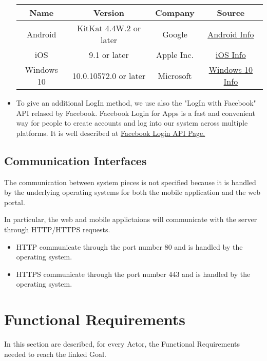\documentclass{report}
\begin{document}
\begin{itemize}
\begin{center}
\begin{table}[h!]
\begin{center}
								\begin{tabular}{cccc}
									\toprule
									\textbf{Name} & \textbf{Version} & \textbf{Company} & \textbf{Source}\\
									\midrule
									Android & KitKat 4.4W.2 or later & Google & \href{https://www.android.com}{Android Info}\\
									\midrule
									iOS & 9.1 or later & Apple Inc. & \href{http://www.apple.com/ios/}{iOS Info}\\
									\midrule
									Windows 10 & 10.0.10572.0 or later & Microsoft & \href{http://www.microsoft.com/it-it/mobile/windows10/?dcmpid=omc-org-globalsite.globalredirect}{Windows 10 Info}\\
									\bottomrule
								\end{tabular}
							\end{center}
							
						\end{table}
					\end{center}

				\item To give an additional LogIn method, we use also the "LogIn with Facebook" API relased by Facebook. Facebook Login for Apps is a fast and convenient way for people to create accounts and log into our system across multiple platforms. It is well described at \href{https://developers.facebook.com/docs/facebook-login}{Facebook Login API Page.}
			\end{itemize}


		\subsection{Communication Interfaces}
		The communication between system pieces is not specified because it is handled by the underlying operating systems for both the mobile application and the web portal.

		In particular, the web and mobile applictaions will communicate with the server through HTTP/HTTPS requests. 

			\begin{itemize}
				\item HTTP communicate through the port number 80 and is handled by the operating system. 
				\item HTTPS communicate through the port number 443 and is handled by the operating system.
			\end{itemize}

	\section{Functional Requirements}
	In this section are described, for every Actor, the Functional Requirements needed to reach the linked Goal.
\end{document}

